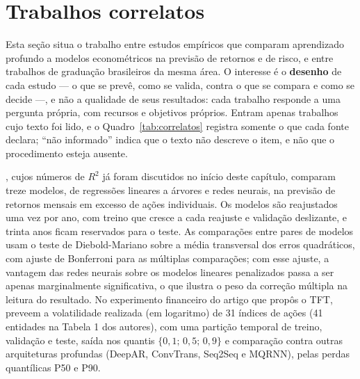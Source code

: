 \section{Trabalhos correlatos}\label{sec:correlatos}
Esta seção situa o trabalho entre estudos empíricos que comparam aprendizado profundo a modelos econométricos na previsão de retornos e de risco, e entre trabalhos de graduação brasileiros da mesma área. O interesse é o \textbf{desenho} de cada estudo --- o que se prevê, como se valida, contra o que se compara e como se decide ---, e não a qualidade de seus resultados: cada trabalho responde a uma pergunta própria, com recursos e objetivos próprios. Entram apenas trabalhos cujo texto foi lido, e o Quadro~\ref{tab:correlatos} registra somente o que cada fonte declara; ``não informado'' indica que o texto não descreve o item, e não que o procedimento esteja ausente.

, cujos números de \(R^2\) já foram discutidos no início deste capítulo, comparam treze modelos, de regressões lineares a árvores e redes neurais, na previsão de retornos mensais em excesso de ações individuais. Os modelos são reajustados uma vez por ano, com treino que cresce a cada reajuste e validação deslizante, e trinta anos ficam reservados para o teste. As comparações entre pares de modelos usam o teste de Diebold-Mariano sobre a média transversal dos erros quadráticos, com ajuste de Bonferroni para as múltiplas comparações; com esse ajuste, a vantagem das redes neurais sobre os modelos lineares penalizados passa a ser apenas marginalmente significativa, o que ilustra o peso da correção múltipla na leitura do resultado. No experimento financeiro do artigo que propôs o TFT,  preveem a volatilidade realizada (em logaritmo) de 31 índices de ações (41 entidades na Tabela 1 dos autores), com uma partição temporal de treino, validação e teste, saída nos quantis \(\{0{,}1;\,0{,}5;\,0{,}9\}\) e comparação contra outras arquiteturas profundas (DeepAR, ConvTrans, Seq2Seq e MQRNN), pelas perdas quantílicas P50 e P90.

